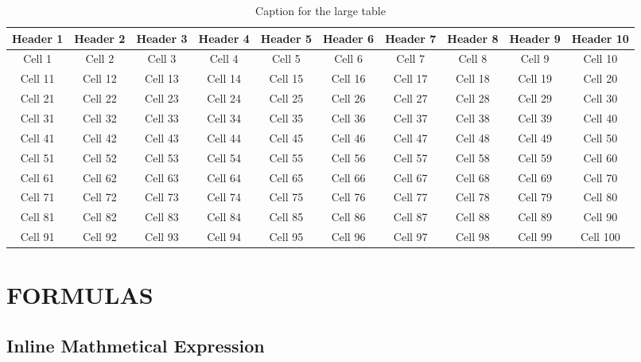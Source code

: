 \documentclass[a4paper,12pt]{article}
\begin{document}
\begin{table}
    \centering
    \caption{Caption for the large table}
    \begin{tabular}{cccccccccc}
        \toprule
        Header 1 & Header 2 & Header 3 & Header 4 & Header 5 & Header 6 & Header 7 & Header 8 & Header 9 & Header 10 \\
        \midrule
        Cell 1 & Cell 2 & Cell 3 & Cell 4 & Cell 5 & Cell 6 & Cell 7 & Cell 8 & Cell 9 & Cell 10 \\ [5ex]
        Cell 11 & Cell 12 & Cell 13 & Cell 14 & Cell 15 & Cell 16 & Cell 17 & Cell 18 & Cell 19 & Cell 20 \\ [5ex]
        Cell 21 & Cell 22 & Cell 23 & Cell 24 & Cell 25 & Cell 26 & Cell 27 & Cell 28 & Cell 29 & Cell 30 \\ [5ex]
        Cell 31 & Cell 32 & Cell 33 & Cell 34 & Cell 35 & Cell 36 & Cell 37 & Cell 38 & Cell 39 & Cell 40 \\ [5ex]
        Cell 41 & Cell 42 & Cell 43 & Cell 44 & Cell 45 & Cell 46 & Cell 47 & Cell 48 & Cell 49 & Cell 50 \\ [5ex]
        Cell 51 & Cell 52 & Cell 53 & Cell 54 & Cell 55 & Cell 56 & Cell 57 & Cell 58 & Cell 59 & Cell 60 \\ [5ex]
        Cell 61 & Cell 62 & Cell 63 & Cell 64 & Cell 65 & Cell 66 & Cell 67 & Cell 68 & Cell 69 & Cell 70 \\ [5ex]
        Cell 71 & Cell 72 & Cell 73 & Cell 74 & Cell 75 & Cell 76 & Cell 77 & Cell 78 & Cell 79 & Cell 80 \\ [5ex]
        Cell 81 & Cell 82 & Cell 83 & Cell 84 & Cell 85 & Cell 86 & Cell 87 & Cell 88 & Cell 89 & Cell 90 \\ [5ex]
        Cell 91 & Cell 92 & Cell 93 & Cell 94 & Cell 95 & Cell 96 & Cell 97 & Cell 98 & Cell 99 & Cell 100 \\

        \bottomrule
    \end{tabular}
    \label{tab:myLargeTable}
\end{table}


\section{FORMULAS}

\subsection{Inline Mathmetical Expression}
\end{document}
